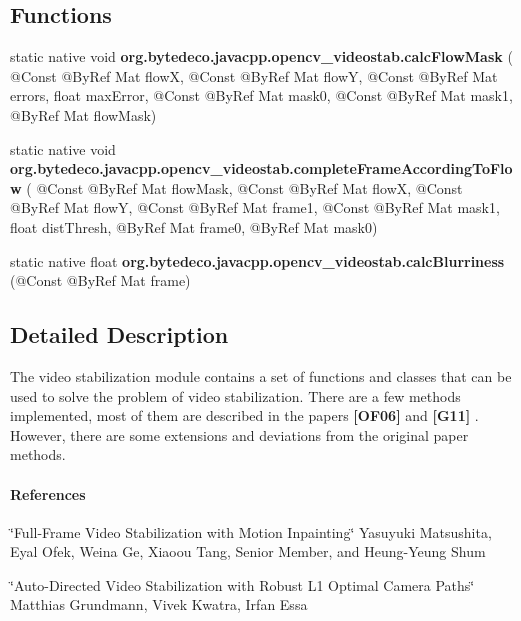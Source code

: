 \subsection*{Functions}
\begin{DoxyCompactItemize}
\item 
\mbox{\label{group__videostab_ga766ce71cb1644c17d7bce3a0662d1e4e}} 
static native void {\bfseries org.\+bytedeco.\+javacpp.\+opencv\+\_\+videostab.\+calc\+Flow\+Mask} ( @Const @By\+Ref Mat flowX, @Const @By\+Ref Mat flowY, @Const @By\+Ref Mat errors, float max\+Error, @Const @By\+Ref Mat mask0, @Const @By\+Ref Mat mask1, @By\+Ref Mat flow\+Mask)
\item 
\mbox{\label{group__videostab_gab29b48a5da43cb1bd65c66ce5103c12c}} 
static native void {\bfseries org.\+bytedeco.\+javacpp.\+opencv\+\_\+videostab.\+complete\+Frame\+According\+To\+Flow} ( @Const @By\+Ref Mat flow\+Mask, @Const @By\+Ref Mat flowX, @Const @By\+Ref Mat flowY, @Const @By\+Ref Mat frame1, @Const @By\+Ref Mat mask1, float dist\+Thresh, @By\+Ref Mat frame0, @By\+Ref Mat mask0)
\item 
\mbox{\label{group__videostab_ga71be1ef830031ec5e131c15176a93b42}} 
static native float {\bfseries org.\+bytedeco.\+javacpp.\+opencv\+\_\+videostab.\+calc\+Blurriness} (@Const @By\+Ref Mat frame)
\end{DoxyCompactItemize}


\subsection{Detailed Description}
The video stabilization module contains a set of functions and classes that can be used to solve the problem of video stabilization. There are a few methods implemented, most of them are described in the papers {\bfseries [O\+F06]} and {\bfseries [G11]} . However, there are some extensions and deviations from the original paper methods. 

\paragraph*{References}


\begin{DoxyEnumerate}
\item \char`\"{}\+Full-\/\+Frame Video Stabilization with Motion Inpainting\char`\"{} Yasuyuki Matsushita, Eyal Ofek, Weina Ge, Xiaoou Tang, Senior Member, and Heung-\/\+Yeung Shum
\item \char`\"{}\+Auto-\/\+Directed Video Stabilization with Robust L1 Optimal Camera Paths\char`\"{} Matthias Grundmann, Vivek Kwatra, Irfan Essa 
\end{DoxyEnumerate}